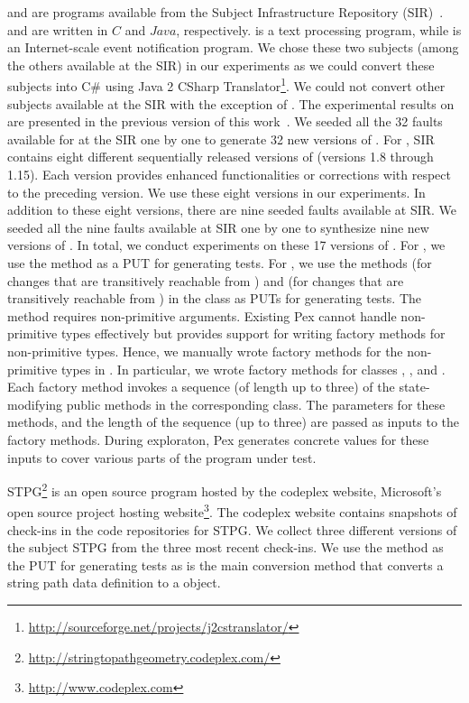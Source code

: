  and  are programs available from the Subject Infrastructure Repository (SIR)~\cite{doESE05}.  and  are written in $C$ and $Java$, respectively.  is a text processing program, while  is an Internet-scale event notification program. We chose these two subjects (among the others available at the SIR) in our experiments as we could convert these subjects into C\# using Java 2 CSharp Translator\footnote{\url{http://sourceforge.net/projects/j2cstranslator/}}. We could not convert other subjects available at the SIR with the exception of . The experimental results on  are presented in the previous version of this work~\cite{taneja09:guided}. We seeded all the 32 faults available for  at the SIR one by one to generate 32 new versions of . For , SIR contains eight different sequentially released versions of  (versions 1.8 through 1.15). Each version provides enhanced functionalities or corrections with respect to the preceding version. We use these eight versions in our experiments. In addition to these eight versions, there are nine seeded faults available at SIR. We seeded all the nine faults available at SIR one by one to synthesize nine new versions of . 
In total, we conduct experiments on these 17 versions of . For , we use the  method as a PUT for generating tests. For , we use the methods  (for changes that are transitively reachable from ) and  (for changes that are transitively reachable from ) in the class  as PUTs for generating tests. The method  requires non-primitive arguments. Existing Pex cannot handle non-primitive types effectively but provides support for writing factory methods for non-primitive types. Hence, we manually wrote factory methods for the non-primitive types in . In particular, we wrote factory methods for classes , , and . Each factory method invokes a sequence (of length up to three) of the state-modifying public methods in the corresponding class. The parameters for these methods, and the length of the sequence (up to three) are passed as inputs to the factory methods. During exploraton, Pex generates concrete values for these inputs to cover various parts of the program under test.

STPG\footnote{\url{http://stringtopathgeometry.codeplex.com/}} is an open source program hosted by the codeplex website, Microsoft's open source project hosting website\footnote{\url{http://www.codeplex.com}}. The codeplex website contains snapshots of check-ins in the code repositories for STPG. We collect three different versions of the subject STPG from the three most recent check-ins. We use the  method as the PUT for generating tests as  is the main conversion method that converts a string path data definition to a  object.

